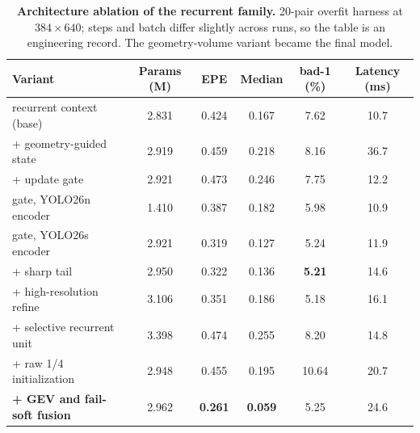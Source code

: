 \begin{table}[!htbp]
\centering
\caption{\textbf{Architecture ablation of the recurrent family.} 20-pair overfit harness at $384\times 640$; steps and batch differ slightly across runs, so the table is an engineering record. The geometry-volume variant became the final model.}
\label{tab:ablation_gev4line}
\small
\begin{tabular}{lccccc}
\toprule
Variant & Params (M) & EPE & Median & bad-1 (\%) & Latency (ms)\\
\midrule
recurrent context (base) & 2.831 & 0.424 & 0.167 & 7.62 & 10.7\\
+ geometry-guided state & 2.919 & 0.459 & 0.218 & 8.16 & 36.7\\
+ update gate & 2.921 & 0.473 & 0.246 & 7.75 & 12.2\\
gate, YOLO26n encoder & 1.410 & 0.387 & 0.182 & 5.98 & 10.9\\
gate, YOLO26s encoder & 2.921 & 0.319 & 0.127 & 5.24 & 11.9\\
+ sharp tail & 2.950 & 0.322 & 0.136 & \textbf{5.21} & 14.6\\
+ high-resolution refine & 3.106 & 0.351 & 0.186 & 5.18 & 16.1\\
+ selective recurrent unit & 3.398 & 0.474 & 0.255 & 8.20 & 14.8\\
+ raw 1/4 initialization & 2.948 & 0.455 & 0.195 & 10.64 & 20.7\\
\textbf{+ GEV and fail-soft fusion} & 2.962 & \textbf{0.261} & \textbf{0.059} & 5.25 & 24.6\\
\bottomrule
\end{tabular}
\end{table}

